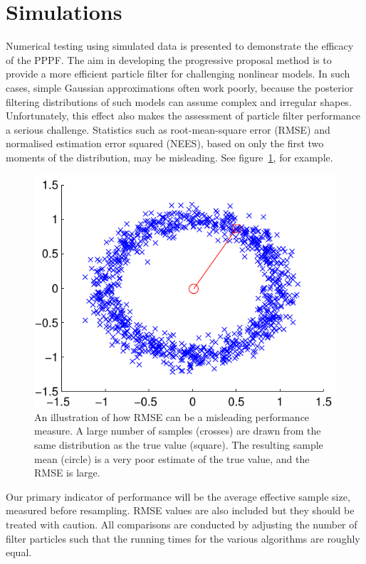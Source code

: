 \documentclass{article}
\begin{document}
\section{Simulations}

Numerical testing using simulated data is presented to demonstrate the efficacy of the PPPF. The aim in developing the progressive proposal method is to provide a more efficient particle filter for challenging nonlinear models. In such cases, simple Gaussian approximations often work poorly, because the posterior filtering distributions of such models can assume complex and irregular shapes. Unfortunately, this effect also makes the assessment of particle filter performance a serious challenge. Statistics such as root-mean-square error (RMSE) and normalised estimation error squared (NEES), based on only the first two moments of the distribution, may be misleading. See figure~\ref{fig:rmse_fail}, for example.
%
\begin{figure}
\centering
\includegraphics[width=0.7\columnwidth]{rmse_fail.pdf}
\caption{An illustration of how RMSE can be a misleading performance measure. A large number of samples (crosses) are drawn from the same distribution as the true value (square). The resulting sample mean (circle) is a very poor estimate of the true value, and the RMSE is large.}
\label{fig:rmse_fail}
\end{figure}

Our primary indicator of performance will be the average effective sample size, measured before resampling. RMSE values are also included but they should be treated with caution. All comparisons are conducted by adjusting the number of filter particles such that the running times for the various algorithms are roughly equal.
\end{document}
